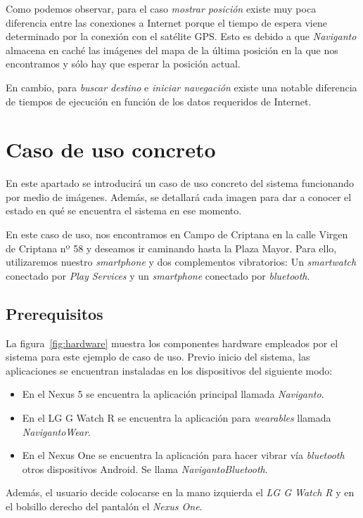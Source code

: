Como podemos observar, para el caso \emph{mostrar posición} existe muy poca diferencia entre las
conexiones a Internet porque el tiempo de espera viene determinado por la conexión con el satélite
\acs{GPS}. Esto es debido a que \emph{Naviganto} almacena en caché las imágenes del mapa de la
última posición en la que nos encontramos y sólo hay que esperar la posición actual.

En cambio, para \emph{buscar destino} e \emph{iniciar navegación} existe una notable diferencia de
tiempos de ejecución en función de los datos requeridos de Internet.

\section{Caso de uso concreto}
En este apartado se introducirá un caso de uso concreto del sistema funcionando por medio de
imágenes. Además, se detallará cada imagen para dar a conocer el estado en qué se encuentra el
sistema en ese momento.

En este caso de uso, nos encontramos en Campo de Criptana en la calle Virgen de Criptana nº 58 y
deseamos ir caminando hasta la Plaza Mayor. Para ello, utilizaremos nuestro \emph{smartphone} y dos
complementos vibratorios: Un \emph{smartwatch} conectado por \emph{Play Services} y un
\emph{smartphone} conectado por \emph{bluetooth}.

\subsection{Prerequisitos}

La figura~\ref{fig:hardware} muestra los componentes hardware empleados por el sistema para este
ejemplo de caso de uso. Previo inicio del sistema, las aplicaciones se encuentran instaladas en los
dispositivos del siguiente modo:

\begin{itemize}
  \item En el Nexus 5 se encuentra la aplicación principal llamada \emph{Naviganto}.
  \item En el LG G Watch R se encuentra la aplicación para \emph{wearables} llamada
    \emph{NavigantoWear}.
  \item En el Nexus One se encuentra la aplicación para hacer vibrar vía \emph{bluetooth} otros
    dispositivos Android. Se llama \emph{NavigantoBluetooth}.
\end{itemize}

Además, el usuario decide colocarse en la mano izquierda el \emph{LG G Watch R} y en el bolsillo
derecho del pantalón el \emph{Nexus One}.

